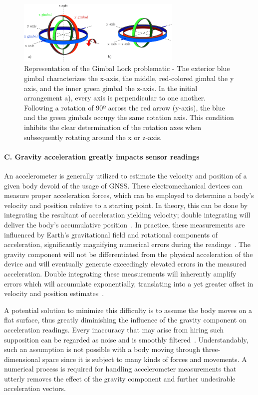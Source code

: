 \begin{figure}[!h]
      \centering
      \includegraphics[width=0.7\textwidth]{figures/gimbal_lock.png}
      \caption{Representation of the Gimbal Lock problematic \cite{zeitlhofler2019nominal} - The exterior blue gimbal characterizes the x-axis, the middle, red-colored gimbal the y axis, and the inner green gimbal the z-axis. In the initial arrangement a), every axis is perpendicular to one another. Following a rotation of 90º across the red arrow (y-axis), the blue and the green gimbals occupy the same rotation axis. This condition inhibits the clear determination of the rotation axes when subsequently rotating around the x or z-axis. }
      \label{fig:gimballock}
\end{figure}

\paragraph{C. Gravity acceleration greatly impacts sensor readings}
An accelerometer is generally utilized to estimate the velocity and position of a given body devoid of the usage of GNSS. These electromechanical devices can measure proper acceleration forces, which can be employed to determine a body’s velocity and position relative to a starting point. In theory, this can be done by integrating the resultant of acceleration yielding velocity; double integrating will deliver the body’s accumulative position~\cite{yang2006simple}. In practice, these measurements are influenced by Earth’s gravitational field and rotational components of acceleration, significantly magnifying numerical errors during the readings~\cite{nistler2011gravity}. The gravity component will not be differentiated from the physical acceleration of the device and will eventually generate exceedingly elevated errors in the measured acceleration. Double integrating these measurements will inherently amplify errors which will accumulate exponentially, translating into a yet greater offset in velocity and position estimates~\cite{thong2004numerical}.

A potential solution to minimize this difficulty is to assume the body moves on a flat surface, thus greatly diminishing the influence of the gravity component on acceleration readings. Every inaccuracy that may arise from hiring such supposition can be regarded as noise and is smoothly filtered~\cite{nistler2011gravity}. Understandably, such an assumption is not possible with a body moving through three-dimensional space since it is subject to many kinds of forces and movements.  A numerical process is required for handling accelerometer measurements that utterly removes the effect of the gravity component and further undesirable acceleration vectors.




